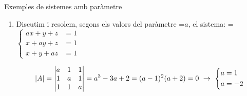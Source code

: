 \documentclass[11pt,a4paper]{article}
\newcommand{\fmm}[1]{\setbox0=\hbox{$#1$}\ifdim\wd0>\linewidth\fmdisp{#1}\else\mbox{\box0}\fi}
\newcommand{\fmdisp}[1]{\[\setbox2=\hbox{$\displaystyle #1$}\ifdim\wd2>\linewidth\resizebox{\linewidth}{!}{\box2}\else\box2\fi\]}
\newcommand{\fmbadge}[2]{\tcbox[on line,colback=#1,colframe=#1,arc=2mm,boxsep=0pt,left=4pt,right=4pt,top=1.5pt,bottom=1.5pt]{\color{white}\footnotesize\bfseries #2}}
\begin{document}
\begin{fmex}{Exemples de sistemes amb paràmetre}
\begin{enumerate}[label=\textbf{\arabic*.},leftmargin=*]
\fmdisp{A^*\xrightarrow[F_3'=F_3-F_1]{F_2'=F_2+2F_1}\left(\begin{array}{rrr|r}-1 & 1 & 1 & 2\\ 0 & 1 & 4 & 4\\ 0 & -1 & -4 & -4\end{array}\right)\xrightarrow{F_3''=F_3'+F_2'}\left(\begin{array}{rrr|r}-1 & 1 & 1 & 2\\ 0 & 1 & 4 & 4\\ 0 & 0 & 0 & 0\end{array}\right)}

\fmdisp{z=\lambda\ \rightarrow\ y=4-4\lambda\ \rightarrow\ -x+(4-4\lambda)+\lambda=2\ \rightarrow\ x=2-3\lambda}

\fmdisp{\boxed{x=2-3\lambda;\ \ y=4-4\lambda;\ \ z=\lambda,\quad\lambda\in\mathbb{R}}}

\textbf{Si \fmm{m\neq1}} \fmm{\rightarrow\operatorname{rg}(A)=3=\operatorname{rg}(A^*)=} nre. d'incògnites \fmm{\rightarrow} \fmbadge{fmok}{SCD}. Ho resolem per Cramer:

\fmdisp{x=\frac{\begin{vmatrix}2 & m & 1\\ 0 & -1 & 2\\ -2 & 0 & -3\end{vmatrix}}{4m-4}=\frac{-4m+4}{4m-4}=-1;\quad y=\frac{\begin{vmatrix}-1 & 2 & 1\\ 2 & 0 & 2\\ -1 & -2 & -3\end{vmatrix}}{4m-4}=\frac{0}{4m-4}=0;\quad z=\frac{\begin{vmatrix}-1 & m & 2\\ 2 & -1 & 0\\ -1 & 0 & -2\end{vmatrix}}{4m-4}=\frac{4m-4}{4m-4}=1}

\fmdisp{\boxed{x=-1;\ \ y=0;\ \ z=1}}

\item Discutim i resolem, segons els valors del paràmetre \fmm{a}, el sistema: \fmm{\left\{\begin{aligned}ax+y+z&=1\\ x+ay+z&=1\\ x+y+az&=1\end{aligned}\right.}

\fmdisp{|A|=\begin{vmatrix}a & 1 & 1\\ 1 & a & 1\\ 1 & 1 & a\end{vmatrix}=a^3-3a+2=(a-1)^2(a+2)=0\ \rightarrow\ \left\{\begin{aligned}a&=1\\ a&=-2\end{aligned}\right.}


\end{enumerate}
\end{fmex}
\end{document}
